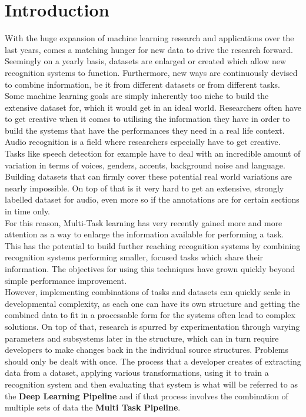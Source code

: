 \chapter{Introduction}


With the huge expansion of machine learning research and applications over the last years, comes a matching hunger for new data to drive the research forward. Seemingly on a yearly basis, datasets are enlarged or created which allow new recognition systems to function. Furthermore, new ways are continuously devised to combine information, be it from different datasets or from different tasks. Some machine learning goals are simply inherently too niche to build the extensive dataset for, which it would get in an ideal world. Researchers often have to get creative when it comes to utilising the information they have in order to build the systems that have the performances they need in a real life context.\\

Audio recognition is a field where researchers especially have to get creative. Tasks like speech detection for example have to deal with an incredible amount of variation in terms of voices, genders, accents, background noise and language. Building datasets that can firmly cover these potential real world variations are nearly impossible. On top of that is it very hard to get an extensive, strongly labelled dataset for audio, even more so if the annotations are for certain sections in time only. \\

For this reason, Multi-Task learning has very recently gained more and more attention as a way to enlarge the information available for performing a task. This has the potential to build further reaching recognition systems by combining recognition systems performing smaller, focused tasks which share their information. The objectives for using this techniques have grown quickly beyond simple performance improvement.\\

However, implementing combinations of tasks and datasets can quickly scale in developmental complexity, as each one can have its own structure and getting the combined data to fit in a processable form for the systems often lead to complex solutions. On top of that, research is spurred by experimentation through varying parameters and subsystems later in the structure, which can in turn require developers to make changes back in the individual source structures. Problems should only be dealt with once. The process that a developer creates of extracting data from a dataset, applying various transformations, using it to train a recognition system and then evaluating that system is what will be referred to as the \textbf{Deep Learning Pipeline} and if that process involves the combination of multiple sets of data the \textbf{Multi Task Pipeline}. \\

